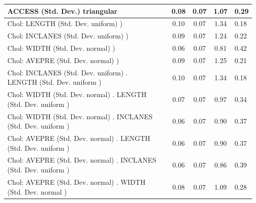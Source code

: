 \begin{table}
\begin{center}
\begin{tabular}{|l|l|c|c|c|l|}
			\hline
			ACCESS (Std. Dev.) triangular &  & 0.08 & 0.07 & 1.07 & 0.29 \\
			\hline
			 Chol: LENGTH (Std. Dev. uniform) ) &  & 0.10 & 0.07 & 1.34 & 0.18 \\
			\hline
			 Chol: INCLANES (Std. Dev. uniform) ) &  & 0.09 & 0.07 & 1.24 & 0.22 \\
			\hline
			 Chol: WIDTH (Std. Dev. normal) ) &  & 0.06 & 0.07 & 0.81 & 0.42 \\
			\hline
			 Chol: AVEPRE (Std. Dev. normal) ) &  & 0.09 & 0.07 & 1.25 & 0.21 \\
			\hline
			 Chol: INCLANES (Std. Dev. uniform) . LENGTH (Std. Dev.   uniform ) &  & 0.10 & 0.07 & 1.34 & 0.18 \\
			\hline
			 Chol: WIDTH (Std. Dev. normal) . LENGTH (Std. Dev.   uniform ) &  & 0.07 & 0.07 & 0.97 & 0.34 \\
			\hline
			 Chol: WIDTH (Std. Dev. normal) . INCLANES (Std. Dev.   uniform ) &  & 0.06 & 0.07 & 0.90 & 0.37 \\
			\hline
			 Chol: AVEPRE (Std. Dev. normal) . LENGTH (Std. Dev.   uniform ) &  & 0.06 & 0.07 & 0.90 & 0.37 \\
			\hline
			 Chol: AVEPRE (Std. Dev. normal) . INCLANES (Std. Dev.   uniform ) &  & 0.06 & 0.07 & 0.86 & 0.39 \\
			\hline
			 Chol: AVEPRE (Std. Dev. normal) . WIDTH (Std. Dev.   normal ) &  & 0.08 & 0.07 & 1.09 & 0.28 \\
			\hline
		\end{tabular}
	\end{center}
\end{table}